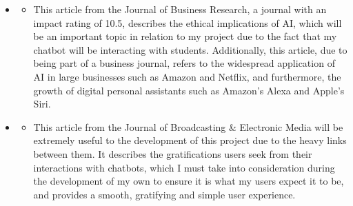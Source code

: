 \documentclass[12pt]{report}
\begin{document}
\begin{itemize}
        \item {}
        \begin{itemize}
            \item This article from the Journal of Business Research, a journal with an impact rating of 10.5,
            describes the ethical implications of AI, which will be an important topic in relation to my project
            due to the fact that my chatbot will be interacting with students. Additionally, this article,
            due to being part of a business journal, refers to the widespread application of AI in large businesses
            such as Amazon and Netflix, and furthermore, the growth of digital personal assistants such as Amazon's
            Alexa and Apple's Siri. 
        \end{itemize}

        \pagebreak

        \item {}
        \begin{itemize}
            \item This article from the Journal of Broadcasting \& Electronic Media will be extremely useful to 
            the development of this project due to the heavy links between them. It describes the gratifications
            users seek from their interactions with chatbots, which I must take into consideration during the 
            development of my own to ensure it is what my users expect it to be, and provides a smooth, gratifying
            and simple user experience.
        \end{itemize}
    \end{itemize}

    \printbibliography
\end{document}

